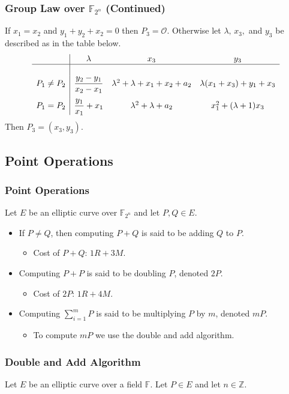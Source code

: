 \documentclass[xcolor=pdftex,dvipsnames,table]{beamer}
\theoremstyle{plain}
\theoremstyle{definition}
\def\ZZ{\mathbb{Z}}
\def\FF{\mathbb{F}}
\begin{document}
\begin{frame}
	\frametitle{Group Law over $\FF_{2^n}$ (Continued)}
	
	If $x_1=x_2$ and $y_1+y_2+x_2=0$ then $P_3=\mathcal{O}$.
	Otherwise let $\lambda,\, x_3,$ and $y_3$ be described as in the table below.
	\[
	\begin{array}{c|ccc}
	& \lambda & x_3 & y_3\\\hline\\[.1em]
	P_1\neq P_2 & \displaystyle \frac{y_2-y_1}{x_2-x_1} & \lambda^2+\lambda+x_1+x_2+a_2 & \lambda(x_1+x_3)+y_1+x_3 \\[1.2em]
	P_1=P_2 &  \displaystyle \frac{y_1}{x_1}+x_1 & \lambda^2+\lambda+a_2 & x_1^2+(\lambda+1)x_3
	\end{array}
	\]
	Then $P_3=(x_3,y_3)$.
\end{frame}

\subsection[Point Operations]{Point Operations}

\begin{frame}
	\frametitle{Point Operations}
	
	Let $E$ be an elliptic curve over $\FF_{2^n}$ and let $P,Q\in E$.
	\begin{itemize}
		\item If $P\neq Q$, then computing $P+Q$ is said to be adding $Q$ to $P$.
		\begin{itemize}
			\item Cost of $P+Q$: $1R+3M$.
		\end{itemize}
		\item Computing $P+P$ is said to be doubling $P$, denoted $2P$.
		\begin{itemize}
			\item Cost of $2P$: $1R+4M$.
		\end{itemize}
		\item Computing $\sum_{i=1}^m P$ is said to be multiplying $P$ by $m$, denoted $mP$.
		\begin{itemize}
			\item To compute $mP$ we use the double and add algorithm.
		\end{itemize}
	\end{itemize}
\end{frame}

\begin{frame}
	\frametitle{Double and Add Algorithm}
	Let $E$ be an elliptic curve over a field $\FF$. 
	Let $P\in E$ and let $n\in\ZZ$.
	\begin{algorithmic}
		\Function{DoubleAdd}{$n\in\ZZ$, $P\in E$}
		\State {}
		\State {}
		\State {}
		\State {}
		\Else
		\State {}
		\EndIf
		\EndFunction
	\end{algorithmic}
\end{frame}
\end{document}
